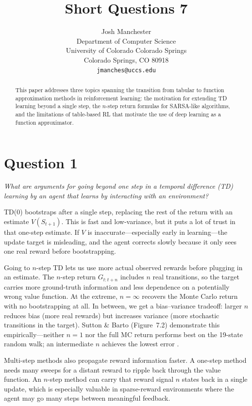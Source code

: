 \documentclass[letterpaper]{article}
\title{Short Questions 7}
\author{
    Josh Manchester\\
    Department of Computer Science\\
    University of Colorado Colorado Springs\\
    Colorado Springs, CO 80918\\
    \texttt{jmanches@uccs.edu}
}
\begin{document}
\maketitle

\begin{abstract}
This paper addresses three topics spanning the transition from tabular to function approximation methods in reinforcement learning: the motivation for extending TD learning beyond a single step, the $n$-step return formulas for SARSA-like algorithms, and the limitations of table-based RL that motivate the use of deep learning as a function approximator.
\end{abstract}

\section*{Question 1}
\textit{What are arguments for going beyond one step in a temporal difference (TD) learning by an agent that learns by interacting with an environment?}

\vspace{0.5em}

TD(0) bootstraps after a single step, replacing the rest of the return with an estimate $V(S_{t+1})$. This is fast and low-variance, but it puts a lot of trust in that one-step estimate. If $V$ is inaccurate---especially early in learning---the update target is misleading, and the agent corrects slowly because it only sees one real reward before bootstrapping.

Going to $n$-step TD lets us use more actual observed rewards before plugging in an estimate. The $n$-step return $G_{t:t+n}$ includes $n$ real transitions, so the target carries more ground-truth information and less dependence on a potentially wrong value function. At the extreme, $n = \infty$ recovers the Monte Carlo return with no bootstrapping at all. In between, we get a bias--variance tradeoff: larger $n$ reduces bias (more real rewards) but increases variance (more stochastic transitions in the target). Sutton \& Barto (Figure~7.2) demonstrate this empirically---neither $n = 1$ nor the full MC return performs best on the 19-state random walk; an intermediate $n$ achieves the lowest error \citep{sutton2018reinforcement}.

Multi-step methods also propagate reward information faster. A one-step method needs many sweeps for a distant reward to ripple back through the value function. An $n$-step method can carry that reward signal $n$ states back in a single update, which is especially valuable in sparse-reward environments where the agent may go many steps between meaningful feedback.
\end{document}

